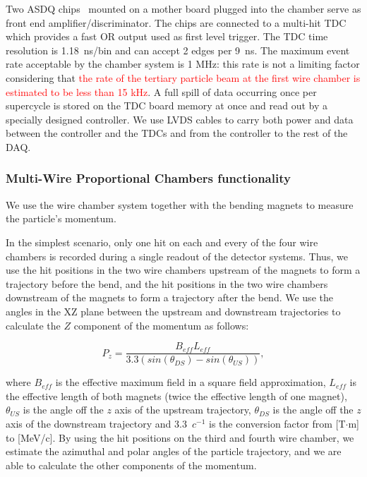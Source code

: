 Two ASDQ chips~\cite{ASDQchip} mounted on a mother board plugged into the chamber serve as front end amplifier/discriminator. The chips are connected to a multi-hit TDC~\cite{Sten} which provides a fast OR output used as first level trigger. The TDC time resolution is 1.18~ns/bin and can accept 2 edges per 9~ns.  
The maximum event rate acceptable by the chamber system is 1 MHz: this rate is not a limiting factor considering that \textcolor{red}{the rate of the tertiary particle beam at the first wire chamber is estimated to be less than 15 kHz}. A full spill of data occurring once per supercycle is stored on the TDC board memory at once and read out by a specially designed controller.  We use LVDS cables to carry both power and data between the controller and the TDCs and from the controller to the rest of the DAQ.  

\subsubsection{Multi-Wire Proportional Chambers functionality}\label{sec:MWPCfunc}
We use the wire chamber system together with the bending magnets to measure the particle's momentum.

In the simplest scenario, only one hit on each and every of the four wire chambers is recorded during a single readout of the detector systems.  Thus, we use the hit positions in the two wire chambers upstream of the magnets to form a trajectory before the bend, and the hit positions in the two wire chambers downstream of the magnets to form a trajectory after the bend. We use the angles in the XZ plane between the upstream and downstream trajectories  to calculate the $Z$ component of the momentum as follows:

\begin{equation}
P_z=\frac{B_{eff}L_{eff}}{3.3(sin(\theta_{DS})-sin(\theta_{US}))},
\label{eq:momformula}
\end{equation}

where $B_{eff}$ is the effective maximum field in a square field approximation,  $L_{eff}$ is the effective length of both magnets (twice the effective length of one magnet), $\theta_{US}$ is the angle off the $z$ axis of the upstream trajectory, $\theta_{DS}$ is the angle off the $z$ axis of the downstream trajectory  and  3.3~$c^{-1}$ is the conversion factor from [T$\cdot$m] to [MeV/c]. By using the hit positions on the third and fourth wire chamber, we estimate the azimuthal and polar angles of the particle trajectory, and we are able to calculate the other components of the momentum. 

